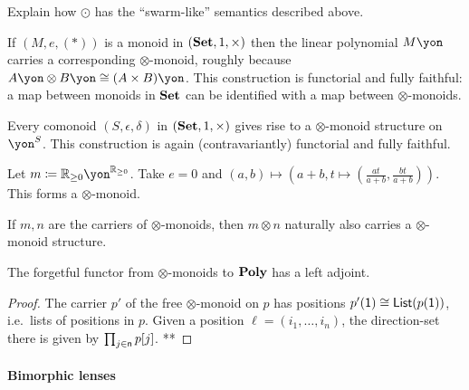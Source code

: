 \documentclass[Book-Poly]{subfiles}
\begin{document}
\begin{exercise}
Explain how $\odot$ has the ``swarm-like'' semantics described above.
\end{exercise}

\begin{example}
If $(M,e,(*))$ is a monoid in $(\textbf{Set},1,\times)$ then the linear polynomial $M\yon$ carries a corresponding $\otimes$-monoid, roughly because $A\yon\otimes B\yon\cong (A\times B)\yon$. This construction is functorial and fully faithful: a map between monoids in $\textbf{Set}$ can be identified with a map between $\otimes$-monoids.
\end{example}

\begin{example}
Every comonoid $(S,\epsilon,\delta)$ in $(\textbf{Set},1,\times)$ gives rise to a $\otimes$-monoid structure on $\yon^S$. This construction is again (contravariantly) functorial and fully faithful.
\end{example}

\begin{example}
Let $m\coloneqq\rr_{\geq0}\yon^{\rr_{\geq0}}$. Take $e=0$ and $(a,b)\mapsto(a+b, t\mapsto (\frac{at}{a+b},\frac{bt}{a+b}))$. This forms a $\otimes$-monoid.
\end{example}

\begin{proposition}
If $m,n$ are the carriers of $\otimes$-monoids, then $m\otimes n$ naturally also carries a $\otimes$-monoid structure.
\end{proposition}

\begin{proposition}
The forgetful functor from $\otimes$-monoids to $\textbf{Poly}$ has a left adjoint.
\end{proposition}
\begin{proof}
The carrier $p'$ of the free $\otimes$-monoid on $p$ has positions $p'(\textsf{1})\cong\mathsf{List}(p(\textsf{1}))$, i.e.\ lists of positions in $p$. Given a position $\ell=(i_1,\ldots,i_n)$, the direction-set there is given by $\prod_{j\in\mathsf{n}} p[j]$.
**
\end{proof}

\paragraph{Bimorphic lenses}\label{page.bimorphic_lens}
\end{document}
